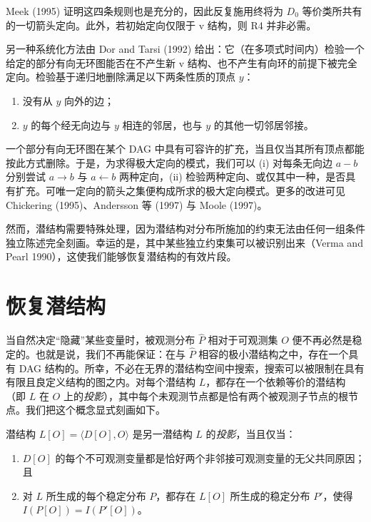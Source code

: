 Meek (1995) 证明这四条规则也是充分的，因此反复施用终将为 $D_0$ 等价类所共有的一切箭头定向。此外，若初始定向仅限于 v 结构，则 R4 并非必需。

另一种系统化方法由 Dor and Tarsi (1992) 给出：它（在多项式时间内）检验一个给定的部分有向无环图能否在不产生新 v 结构、也不产生有向环的前提下被完全定向。检验基于递归地删除满足以下两条性质的顶点 $y$：
\begin{enumerate}[label=\arabic*.,leftmargin=1.8em]
\item 没有从 $y$ 向外的边；
\item $y$ 的每个经无向边与 $y$ 相连的邻居，也与 $y$ 的其他一切邻居邻接。
\end{enumerate}
一个部分有向无环图在某个 DAG 中具有可容许的扩充，当且仅当其所有顶点都能按此方式删除。于是，为求得极大定向的模式，我们可以 (i) 对每条无向边 $a-b$ 分别尝试 $a\to b$ 与 $a\leftarrow b$ 两种定向，(ii) 检验两种定向、或仅其中一种，是否具有扩充。可唯一定向的箭头之集便构成所求的极大定向模式。更多的改进可见 Chickering (1995)、Andersson 等 (1997) 与 Moole (1997)。

然而，潜结构需要特殊处理，因为潜结构对分布所施加的约束无法由任何一组条件独立陈述完全刻画。幸运的是，其中某些独立约束集可以被识别出来（Verma and Pearl 1990），这使我们能够恢复潜结构的有效片段。

\section{恢复潜结构}

当自然决定“隐藏”某些变量时，被观测分布 $\hat{P}$ 相对于可观测集 $O$ 便不再必然是稳定的。也就是说，我们不再能保证：在与 $\hat{P}$ 相容的极小潜结构之中，存在一个具有 DAG 结构的。所幸，不必在无界的潜结构空间中搜索，搜索可以被限制在具有有限且良定义结构的图之内。对每个潜结构 $L$，都存在一个依赖等价的潜结构（即 $L$ 在 $O$ 上的\emph{投影}），其中每个未观测节点都是恰有两个被观测子节点的根节点。我们把这个概念显式刻画如下。

\begin{definition}[投影]
潜结构 $L[O]=\langle D[O],O\rangle$ 是另一潜结构 $L$ 的\emph{投影}，当且仅当：
\begin{enumerate}[label=\arabic*.,leftmargin=1.8em]
\item $D[O]$ 的每个不可观测变量都是恰好两个非邻接可观测变量的无父共同原因；且
\item 对 $L$ 所生成的每个稳定分布 $P$，都存在 $L[O]$ 所生成的稳定分布 $P'$，使得 $I(P[O])=I(P'[O])$。
\end{enumerate}
\end{definition}

